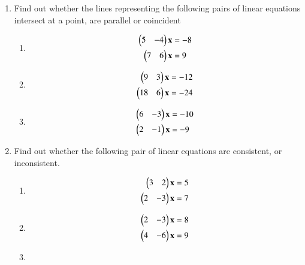 \begin{enumerate}[label=\arabic*.,ref=\thesubsection.\theenumi]
\item Find out whether the lines representing the
following pairs of linear equations intersect at a point, are parallel or coincident
%
\begin{enumerate}[itemsep=2pt]
\item
\begin{align}
\begin{split}
\begin{pmatrix}5 & -4 \end{pmatrix}\mathbf{x}&=-8
\\
\begin{pmatrix}7 & 6 \end{pmatrix}\mathbf{x}&=9
\end{split}
\end{align}
\item
\begin{align}
\begin{split}
\begin{pmatrix}9 & 3 \end{pmatrix}\mathbf{x}&=-12
\\
\begin{pmatrix}18 & 6 \end{pmatrix}\mathbf{x}&=-24
\end{split}
\end{align}
\item
\begin{align}
\begin{split}
\begin{pmatrix}6 & -3 \end{pmatrix}\mathbf{x}&=-10
\\
\begin{pmatrix}2 & -1 \end{pmatrix}\mathbf{x}&=-9
\end{split}
\end{align}
\end{enumerate}
%
\item Find out whether the following pair of linear
equations are consistent, or inconsistent.
%
\begin{enumerate}[itemsep=2pt]
\item
\begin{align}
\begin{split}
\begin{pmatrix}3 & 2 \end{pmatrix}\mathbf{x}&=5
\\
\begin{pmatrix}2 & -3 \end{pmatrix}\mathbf{x}&=7
\end{split}
\end{align}
\item
\begin{align}
\begin{split}
\begin{pmatrix}2 & -3 \end{pmatrix}\mathbf{x}&=8
\\
\begin{pmatrix}4 & -6 \end{pmatrix}\mathbf{x}&=9
\end{split}
\end{align}
\item
\begin{align}
\begin{split}

\end{split}
\end{align}
\end{enumerate}
\end{enumerate}
